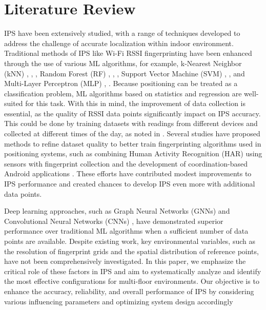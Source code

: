 \documentclass[conference]{IEEEtran}
\begin{document}
	\section{Literature Review}
	IPS have been extensively studied, with a range of techniques developed to address the challenge of accurate localization within indoor environment. Traditional methods of IPS like Wi-Fi RSSI fingerprinting have been enhanced through the use of various ML algorithms, for example, k-Nearest Neighbor (kNN) \cite{LRE1}, \cite{LRE2}, \cite{LRE6}, Random Forest (RF) \cite{LRE1}, \cite{LRE6}, \cite{LRE5}, Support Vector Machine (SVM) \cite{LRE1}, \cite{LRE2}, \cite{LRE6} and Multi-Layer Perceptron (MLP) \cite{LRE1}, \cite{LRE2}. Because positioning can be treated as a classification problem,  ML algorithms based on statistics and regression are well-suited for this task. With this in mind, the improvement of data collection is essential, as the quality of RSSI data points significantly impact on IPS accuracy. This could be done by training datasets with readings from different devices and collected at different times of the day, as noted in \cite{LRE3}. Several studies have proposed methods to refine dataset quality to better train fingerprinting algorithms used in positioning systems, such as combining Human Activity Recognition (HAR) using sensors with fingerprint collection \cite{LRE4} and the development of coordination-based Android applications \cite{LRE7}. These efforts have contributed modest improvements to IPS performance and created chances to develop IPS even more with additional data points. 
	
	Deep learning approaches, such as Graph Neural Networks (GNNs) \cite{LRE2} and Convolutional Neural Networks (CNNs) \cite{LRE4}, have demonstrated superior performance over traditional ML algorithms when a sufficient number of data points are available. Despite existing work, key environmental variables, such as the resolution of fingerprint grids and the spatial distribution of reference points, have not been comprehensively investigated. In this paper, we emphasize the critical role of these factors in IPS and aim to systematically analyze and identify the most effective configurations for multi-floor environments. Our objective is to enhance the accuracy, reliability, and overall performance of IPS by considering various influencing parameters and optimizing system design accordingly
	
	
	
\end{document}
